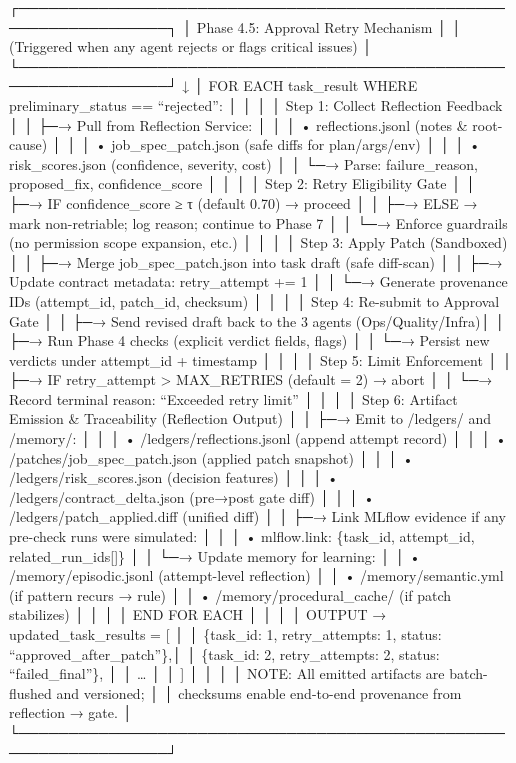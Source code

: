 \documentclass[
]{article}
\begin{document}
┌─────────────────────────────────────────────────────────────────┐ │
Phase 4.5: Approval Retry Mechanism │ │ (Triggered when any agent
rejects or flags critical issues) │
└─────────────────────────────────────────────────────────────────┘ ↓ │
FOR EACH task\_result WHERE preliminary\_status == ``rejected'': │ │ │ │
Step 1: Collect Reflection Feedback │ │ ├─→ Pull from Reflection
Service: │ │ │ • reflections.jsonl (notes \& root-cause) │ │ │ •
job\_spec\_patch.json (safe diffs for plan/args/env) │ │ │ •
risk\_scores.json (confidence, severity, cost) │ │ └─→ Parse:
failure\_reason, proposed\_fix, confidence\_score │ │ │ │ Step 2: Retry
Eligibility Gate │ │ ├─→ IF confidence\_score ≥ τ (default 0.70) →
proceed │ │ ├─→ ELSE → mark non-retriable; log reason; continue to Phase
7 │ │ └─→ Enforce guardrails (no permission scope expansion, etc.) │ │ │
│ Step 3: Apply Patch (Sandboxed) │ │ ├─→ Merge job\_spec\_patch.json
into task draft (safe diff-scan) │ │ ├─→ Update contract metadata:
retry\_attempt += 1 │ │ └─→ Generate provenance IDs (attempt\_id,
patch\_id, checksum) │ │ │ │ Step 4: Re-submit to Approval Gate │ │ ├─→
Send revised draft back to the 3 agents (Ops/Quality/Infra)│ │ ├─→ Run
Phase 4 checks (explicit verdict fields, flags) │ │ └─→ Persist new
verdicts under attempt\_id + timestamp │ │ │ │ Step 5: Limit Enforcement
│ │ ├─→ IF retry\_attempt \textgreater{} MAX\_RETRIES (default = 2) →
abort │ │ └─→ Record terminal reason: ``Exceeded retry limit'' │ │ │ │
Step 6: Artifact Emission \& Traceability (Reflection Output) │ │ ├─→
Emit to /ledgers/ and /memory/: │ │ │ • /ledgers/reflections.jsonl
(append attempt record) │ │ │ • /patches/job\_spec\_patch.json (applied
patch snapshot) │ │ │ • /ledgers/risk\_scores.json (decision features) │
│ │ • /ledgers/contract\_delta.json (pre→post gate diff) │ │ │ •
/ledgers/patch\_applied.diff (unified diff) │ │ ├─→ Link MLflow evidence
if any pre-check runs were simulated: │ │ │ • mlflow.link: \{task\_id,
attempt\_id, related\_run\_ids{[}{]}\} │ │ └─→ Update memory for
learning: │ │ • /memory/episodic.jsonl (attempt-level reflection) │ │ •
/memory/semantic.yml (if pattern recurs → rule) │ │ •
/memory/procedural\_cache/ (if patch stabilizes) │ │ │ │ END FOR EACH │
│ │ │ OUTPUT → updated\_task\_results = {[} │ │ \{task\_id: 1,
retry\_attempts: 1, status: ``approved\_after\_patch''\},│ │ \{task\_id:
2, retry\_attempts: 2, status: ``failed\_final''\}, │ │ \ldots{} │ │ {]}
│ │ │ │ NOTE: All emitted artifacts are batch-flushed and versioned; │ │
checksums enable end-to-end provenance from reflection → gate. │
└─────────────────────────────────────────────────────────────────┘
\end{document}

